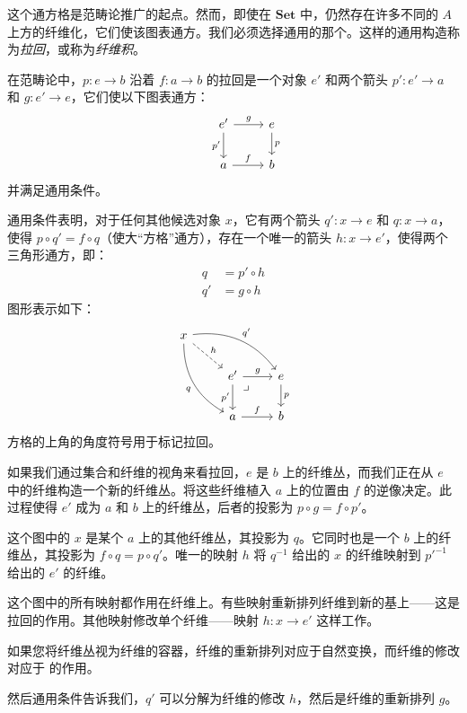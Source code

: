 \documentclass[DaoFP]{subfiles}
\begin{document}
 这个通方格是范畴论推广的起点。然而，即使在 $\mathbf{Set}$ 中，仍然存在许多不同的 $A$ 上方的纤维化，它们使该图表通方。我们必须选择通用的那个。这样的通用构造称为\emph{拉回}，或称为\emph{纤维积}。

 在范畴论中，$p \colon e \to b$ 沿着 $f \colon a \to b$ 的拉回是一个对象 $e'$ 和两个箭头 $p' \colon e' \to a$ 和 $g \colon e' \to e$，它们使以下图表通方：
 \[
  \begin{tikzcd}
   &e'
   \arrow[r, "g"]
   \arrow[d, "p'"']
   &e
   \arrow[d, "p"]
   \\
   &a
   \arrow[r, "f"]
   &b
  \end{tikzcd}
 \]
 并满足通用条件。

 通用条件表明，对于任何其他候选对象 $x$，它有两个箭头 $q' \colon x \to e$ 和 $q \colon x \to a$，使得 $p \circ q' = f \circ q$（使大“方格”通方），存在一个唯一的箭头 $h \colon x \to e'$，使得两个三角形通方，即：
 \begin{align*}
  q &= p' \circ h \\
  q' &= g \circ h
 \end{align*}
 图形表示如下：
 \[
  \begin{tikzcd}
   x
   \arrow[dr, dashed, "h"]
   \arrow[drr, bend left, "q'"]
   \arrow[ddr, bend right, "q"']
   \\
   &e'
   \arrow[r, "g"]
   \arrow[d, "p'"']
   \arrow[dr, phantom,  , very near start, "\lrcorner"]
   &e
   \arrow[d, "p"]
   \\
   &a
   \arrow[r, "f"]
   &b
  \end{tikzcd}
 \]
 方格的上角的角度符号用于标记拉回。

 如果我们通过集合和纤维的视角来看拉回，$e$ 是 $b$ 上的纤维丛，而我们正在从 $e$ 中的纤维构造一个新的纤维丛。将这些纤维植入 $a$ 上的位置由 $f$ 的逆像决定。此过程使得 $e'$ 成为 $a$ 和 $b$ 上的纤维丛，后者的投影为 $p \circ g = f \circ p'$。

 这个图中的 $x$ 是某个 $a$ 上的其他纤维丛，其投影为 $q$。它同时也是一个 $b$ 上的纤维丛，其投影为 $f \circ q = p \circ q'$。唯一的映射 $h$ 将 $q^{-1}$ 给出的 $x$ 的纤维映射到 $p'^{-1}$ 给出的 $e'$ 的纤维。

 这个图中的所有映射都作用在纤维上。有些映射重新排列纤维到新的基上——这是拉回的作用。其他映射修改单个纤维——映射 $h \colon x \to e'$ 这样工作。

 如果您将纤维丛视为纤维的容器，纤维的重新排列对应于自然变换，而纤维的修改对应于  的作用。

 然后通用条件告诉我们，$q'$ 可以分解为纤维的修改 $h$，然后是纤维的重新排列 $g$。
\end{document}
